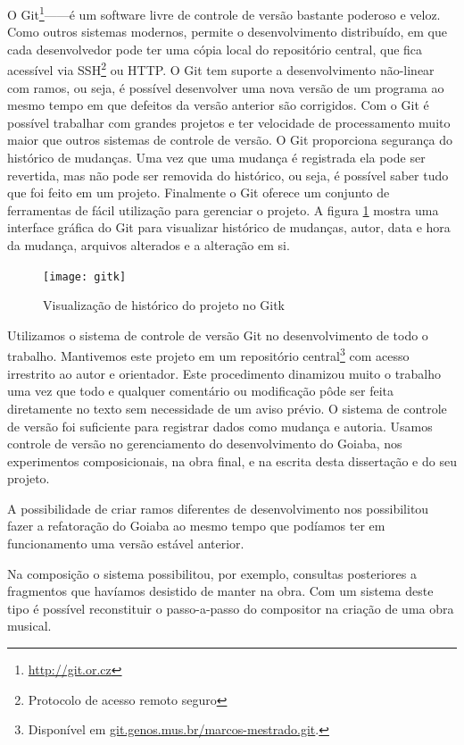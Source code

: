 O Git\footnote{\url{http://git.or.cz}}------é um software livre de controle de versão bastante
poderoso e veloz. Como outros sistemas modernos, permite o
desenvolvimento distribuído, em que cada desenvolvedor pode ter uma
cópia local do repositório central, que fica acessível via
SSH\footnote{Protocolo de acesso remoto seguro} ou HTTP. O Git tem
suporte a desenvolvimento não-linear com ramos, ou seja, é possível
desenvolver uma nova versão de um programa ao mesmo tempo em que
defeitos da versão anterior são corrigidos. Com o Git é possível
trabalhar com grandes projetos e ter velocidade de processamento muito
maior que outros sistemas de controle de versão. O Git proporciona
segurança do histórico de mudanças. Uma vez que uma mudança é
registrada ela pode ser revertida, mas não pode ser removida do
histórico, ou seja, é possível saber tudo que foi feito em um
projeto. Finalmente o Git oferece um conjunto de ferramentas de fácil
utilização para gerenciar o projeto. A figura \ref{fig:historico-git}
mostra uma interface gráfica do Git para visualizar histórico de
mudanças, autor, data e hora da mudança, arquivos alterados e a
alteração em si.

\begin{figure}
  \centering
  \texttt{[image: gitk]}
  \caption{Visualização de histórico do projeto no Gitk}
  \label{fig:historico-git}
\end{figure}

Utilizamos o sistema de controle de versão Git no desenvolvimento de
todo o trabalho. Mantivemos este projeto em um repositório
central\footnote{Disponível em
  \url{git.genos.mus.br/marcos-mestrado.git}.} com acesso irrestrito
ao autor e orientador. Este procedimento dinamizou muito o trabalho
uma vez que todo e qualquer comentário ou modificação pôde ser feita
diretamente no texto sem necessidade de um aviso prévio. O sistema de
controle de versão foi suficiente para registrar dados como mudança e
autoria. Usamos controle de versão no gerenciamento do desenvolvimento
do Goiaba, nos experimentos composicionais, na obra final, e na
escrita desta dissertação e do seu projeto.

A possibilidade de criar ramos diferentes de desenvolvimento nos
possibilitou fazer a refatoração do Goiaba ao mesmo tempo que podíamos
ter em funcionamento uma versão estável anterior.

Na composição o sistema possibilitou, por exemplo, consultas
posteriores a fragmentos que havíamos desistido de manter na obra. Com
um sistema deste tipo é possível reconstituir o passo-a-passo do
compositor na criação de uma obra musical.

